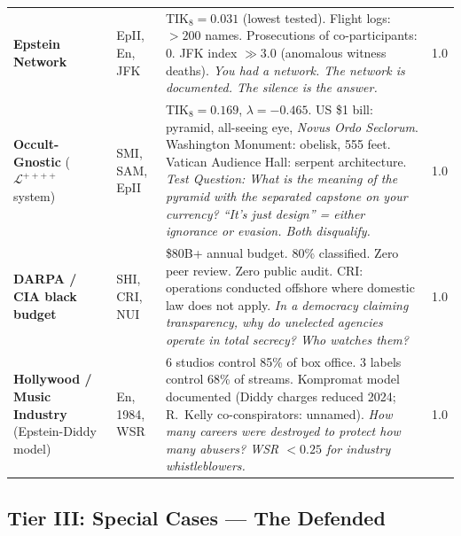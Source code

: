 \documentclass[11pt,a4paper]{article}
\theoremstyle{definition}
\theoremstyle{remark}
\newcommand{\LondonOp}{\mathcal{L}^{++++}}  %
\begin{document}
\begin{longtable}{@{}p{}p{}
  p{}p{}@{}}
\textbf{Epstein Network}
& EpII, En, JFK
& TIK$_8 = 0.031$ (lowest tested).
  Flight logs: $> 200$ names.
  Prosecutions of co-participants: 0.
  JFK index $\gg 3.0$ (anomalous witness deaths).
  \textit{You had a network.
  The network is documented.
  The silence is the answer.} &
  1.0 \\[6pt]

\textbf{Occult-Gnostic}
\newline($\LondonOp$ system)
& SMI, SAM, EpII
& TIK$_8 = 0.169$, $\lambda = -0.465$.
  US \$1 bill: pyramid, all-seeing eye,
  \textit{Novus Ordo Seclorum}.
  Washington Monument: obelisk, 555 feet.
  Vatican Audience Hall: serpent architecture.
  \textit{Test Question:
  What is the meaning of the pyramid
  with the separated capstone on your currency?
  ``It's just design'' = either ignorance or evasion.
  Both disqualify.} &
  1.0 \\[6pt]

\textbf{DARPA / CIA black budget}
& SHI, CRI, NUI
& \$80B+ annual budget. 80\% classified.
  Zero peer review. Zero public audit.
  CRI: operations conducted offshore
  where domestic law does not apply.
  \textit{In a democracy claiming transparency,
  why do unelected agencies operate in total secrecy?
  Who watches them?} &
  1.0 \\[6pt]

\textbf{Hollywood / Music Industry}
\newline(Epstein-Diddy model)
& En, 1984, WSR
& 6 studios control 85\% of box office.
  3 labels control 68\% of streams.
  Kompromat model documented
  (Diddy charges reduced 2024; R.~Kelly co-conspirators: unnamed).
  \textit{How many careers were destroyed
  to protect how many abusers?
  WSR $< 0.25$ for industry whistleblowers.} &
  1.0 \\

\end{longtable}

\subsection{Tier III: Special Cases — The Defended}
\label{sec:list-tier3}
\end{document}
